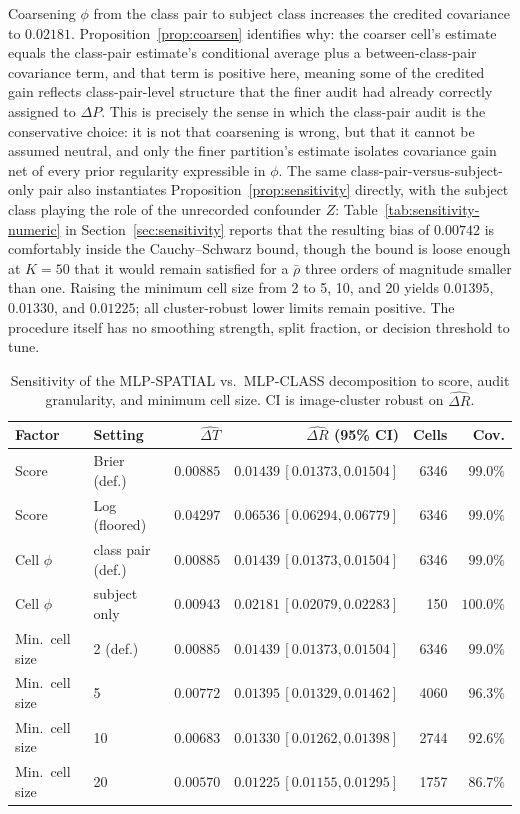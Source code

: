 Coarsening $\phi$ from the class pair to subject class increases the credited covariance
to $0.02181$. Proposition~\ref{prop:coarsen} identifies why: the coarser cell's estimate
equals the class-pair estimate's conditional average plus a between-class-pair covariance
term, and that term is positive here, meaning some of the credited gain reflects
class-pair-level structure that the finer audit had already correctly assigned to
$\Delta P$. This is precisely the sense in which the class-pair audit is the conservative
choice: it is not that coarsening is wrong, but that it cannot be assumed neutral, and
only the finer partition's estimate isolates covariance gain net of every prior regularity
expressible in $\phi$. The same class-pair-versus-subject-only pair also instantiates
Proposition~\ref{prop:sensitivity} directly, with the subject class playing the role of
the unrecorded confounder $Z$: Table~\ref{tab:sensitivity-numeric} in
Section~\ref{sec:sensitivity} reports that the resulting bias of $0.00742$ is comfortably
inside the Cauchy--Schwarz bound, though the bound is loose enough at $K=50$ that it
would remain satisfied for a $\bar\rho$ three orders of magnitude smaller than one.
Raising the minimum cell size from 2 to 5, 10, and 20 yields
$0.01395$, $0.01330$, and $0.01225$; all cluster-robust lower limits remain positive.
The procedure itself has no smoothing strength, split fraction, or decision threshold
to tune.

\begin{table}[t]
\centering
\caption{Sensitivity of the MLP-SPATIAL vs.\ MLP-CLASS decomposition to score, audit
granularity, and minimum cell size. CI is image-cluster robust on $\widehat{\Delta R}$.}
\label{tab:sensitivity}
\small
\begin{tabular}{@{}llrr@{\,}rr@{}}
\toprule
Factor & Setting & $\widehat{\Delta T}$ & \multicolumn{1}{r}{$\widehat{\Delta R}$ (95\% CI)} & Cells &
Cov. \\
\midrule
Score & Brier (def.) & $0.00885$ & $0.01439\,[0.01373,0.01504]$ & 6346 & $99.0\%$ \\
Score & Log (floored) & $0.04297$ & $0.06536\,[0.06294,0.06779]$ & 6346 & $99.0\%$ \\
Cell $\phi$ & class pair (def.) & $0.00885$ & $0.01439\,[0.01373,0.01504]$ & 6346 & $99.0\%$ \\
Cell $\phi$ & subject only & $0.00943$ & $0.02181\,[0.02079,0.02283]$ & 150 & $100.0\%$ \\
Min.\ cell size & 2 (def.) & $0.00885$ & $0.01439\,[0.01373,0.01504]$ & 6346 & $99.0\%$ \\
Min.\ cell size & 5 & $0.00772$ & $0.01395\,[0.01329,0.01462]$ & 4060 & $96.3\%$ \\
Min.\ cell size & 10 & $0.00683$ & $0.01330\,[0.01262,0.01398]$ & 2744 & $92.6\%$ \\
Min.\ cell size & 20 & $0.00570$ & $0.01225\,[0.01155,0.01295]$ & 1757 & $86.7\%$ \\
\bottomrule
\end{tabular}
\end{table}


